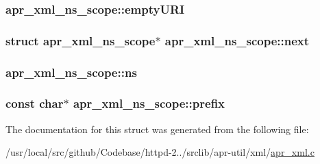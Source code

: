 \subsubsection[{\texorpdfstring{empty\+U\+RI}{emptyURI}}]{ apr\+\_\+xml\+\_\+ns\+\_\+scope\+::empty\+U\+RI}\hypertarget{structapr__xml__ns__scope_ae1ad63d02e18e0124707c818e6d55cd4}{}\label{structapr__xml__ns__scope_ae1ad63d02e18e0124707c818e6d55cd4}
\subsubsection[{\texorpdfstring{next}{next}}]{\setlength{\rightskip}{0pt plus 5cm}struct {\bf apr\+\_\+xml\+\_\+ns\+\_\+scope}$\ast$ apr\+\_\+xml\+\_\+ns\+\_\+scope\+::next}\hypertarget{structapr__xml__ns__scope_a12dfdbc4ab84eac78d8d1bde7d23f78f}{}\label{structapr__xml__ns__scope_a12dfdbc4ab84eac78d8d1bde7d23f78f}
\subsubsection[{\texorpdfstring{ns}{ns}}]{ apr\+\_\+xml\+\_\+ns\+\_\+scope\+::ns}\hypertarget{structapr__xml__ns__scope_a2d2f6a6f48e5d9ab54092a8f1c7ee298}{}\label{structapr__xml__ns__scope_a2d2f6a6f48e5d9ab54092a8f1c7ee298}
\subsubsection[{\texorpdfstring{prefix}{prefix}}]{\setlength{\rightskip}{0pt plus 5cm}const char$\ast$ apr\+\_\+xml\+\_\+ns\+\_\+scope\+::prefix}\hypertarget{structapr__xml__ns__scope_a056c58d0181b445b71bf830adb8d234a}{}\label{structapr__xml__ns__scope_a056c58d0181b445b71bf830adb8d234a}


The documentation for this struct was generated from the following file\+:\begin{DoxyCompactItemize}
\item 
/usr/local/src/github/\+Codebase/httpd-\/2../srclib/apr-\/util/xml/\hyperlink{apr__xml_8c}{apr\+\_\+xml.\+c}\end{DoxyCompactItemize}
